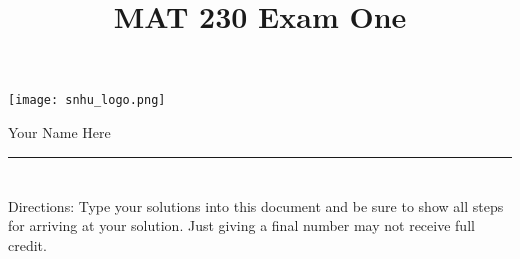 \documentclass{amsart}
\theoremstyle{definition}
\theoremstyle{Exercise}
\theoremstyle{remark}
\theoremstyle{rule}
\numberwithin{equation}{section}
\begin{document}
\title{\sf MAT 230 Exam One}%


\begin{center}
\texttt{[image: snhu\_logo.png]}
\end{center}


\begin{center}
Your Name Here
\end{center}

\begin{center}
\rule{\textwidth}{0.4pt}
\end{center}
\newpage
\section*{}
\section*{}
Directions: Type your solutions into this document and be sure to show all steps for arriving at your solution. Just giving a final number may not receive full credit.
\\
\end{document}
